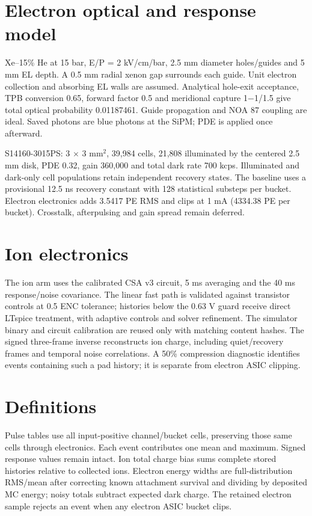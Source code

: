 \documentclass[11pt,a4paper]{article}
\begin{document}
\section*{Electron optical and response model}
Xe--15\% He at 15 bar, E/P = 2 kV/cm/bar, 2.5 mm diameter holes/guides and 5 mm EL depth. A 0.5 mm radial xenon gap surrounds each guide. Unit electron collection and absorbing EL walls are assumed. Analytical hole-exit acceptance, TPB conversion 0.65, forward factor 0.5 and meridional capture 1$-$1/1.5 give total optical probability 0.01187461. Guide propagation and NOA 87 coupling are ideal. Saved photons are blue photons at the SiPM; PDE is applied once afterward.

S14160-3015PS: 3 $\times$ 3 mm$^2$, 39,984 cells, 21,808 illuminated by the centered 2.5 mm disk, PDE 0.32, gain 360,000 and total dark rate 700 kcps. Illuminated and dark-only cell populations retain independent recovery states. The baseline uses a provisional 12.5 ns recovery constant with 128 statistical substeps per bucket. Electron electronics adds 3.5417 PE RMS and clips at 1 mA (4334.38 PE per bucket). Crosstalk, afterpulsing and gain spread remain deferred.
\section*{Ion electronics}
The ion arm uses the calibrated CSA v3 circuit, 5 ms averaging and the 40 ms response/noise covariance. The linear fast path is validated against transistor controls at 0.5 ENC tolerance; histories below the 0.63 V guard receive direct LTspice treatment, with adaptive controls and solver refinement. The simulator binary and circuit calibration are reused only with matching content hashes. The signed three-frame inverse reconstructs ion charge, including quiet/recovery frames and temporal noise correlations. A 50\% compression diagnostic identifies events containing such a pad history; it is separate from electron ASIC clipping.
\section*{Definitions}
Pulse tables use all input-positive channel/bucket cells, preserving those same cells through electronics. Each event contributes one mean and maximum. Signed response values remain intact. Ion total charge bias sums complete stored histories relative to collected ions. Electron energy widths are full-distribution RMS/mean after correcting known attachment survival and dividing by deposited MC energy; noisy totals subtract expected dark charge. The retained electron sample rejects an event when any electron ASIC bucket clips.
\end{document}
